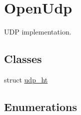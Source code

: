 \hypertarget{group___open_udp}{}\section{Open\+Udp}
\label{group___open_udp}


U\+DP implementation.  


\subsection*{Classes}
\begin{DoxyCompactItemize}
\item 
struct \hyperlink{structudp__ht}{udp\+\_\+ht}
\end{DoxyCompactItemize}
\subsection*{Enumerations}

